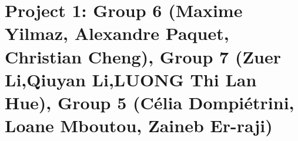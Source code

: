 \documentclass{article}
\begin{document}


\section*{Project 1:  Group 6 (Maxime Yilmaz, Alexandre Paquet, Christian Cheng), Group 7 (Zuer Li,Qiuyan Li,LUONG Thi Lan Hue), Group 5 (Célia Dompiétrini, Loane Mboutou,  Zaineb Er-raji) }
\end{document}
